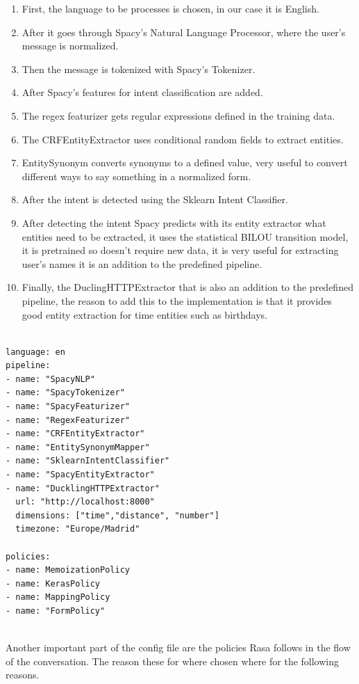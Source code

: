 \begin{enumerate}
	\item {First, the language to be processes is chosen, in our case it is English.}
	\item {After it goes through Spacy’s Natural Language Processor, where the user’s message is normalized.}
	\item {Then the message is tokenized with Spacy’s Tokenizer.}
	\item {After Spacy’s features for intent classification are added.}
	\item {The regex featurizer gets regular expressions defined in the training data.}
	\item {The CRFEntityExtractor uses conditional random fields to extract entities.}
	\item {EntitySynonym converts synonyms to a defined value, very useful to convert different ways to say something in a normalized form.}
	\item {After the intent is detected using the Sklearn Intent Classifier.}
	\item {After detecting the intent Spacy predicts with its entity extractor what entities need to be extracted, it uses the statistical BILOU transition model, it is pretrained so doesn’t require new data, it is very useful for extracting user’s names it is an addition to the predefined pipeline.}
	\item {Finally, the DuclingHTTPExtractor that is also an addition to the predefined pipeline, the reason to add this to the implementation is that it provides good entity extraction for time entities such as birthdays.}
\end{enumerate}

\begin{lstlisting}

language: en
pipeline:
- name: "SpacyNLP"
- name: "SpacyTokenizer"
- name: "SpacyFeaturizer"
- name: "RegexFeaturizer"
- name: "CRFEntityExtractor"
- name: "EntitySynonymMapper"
- name: "SklearnIntentClassifier"
- name: "SpacyEntityExtractor"
- name: "DucklingHTTPExtractor"
  url: "http://localhost:8000"
  dimensions: ["time","distance", "number"]
  timezone: "Europe/Madrid"

policies:
- name: MemoizationPolicy
- name: KerasPolicy
- name: MappingPolicy
- name: "FormPolicy"


\end{lstlisting}

Another important part of the config file are the policies Rasa follows in the flow of the conversation. The reason these for where chosen where for the following reasons.

